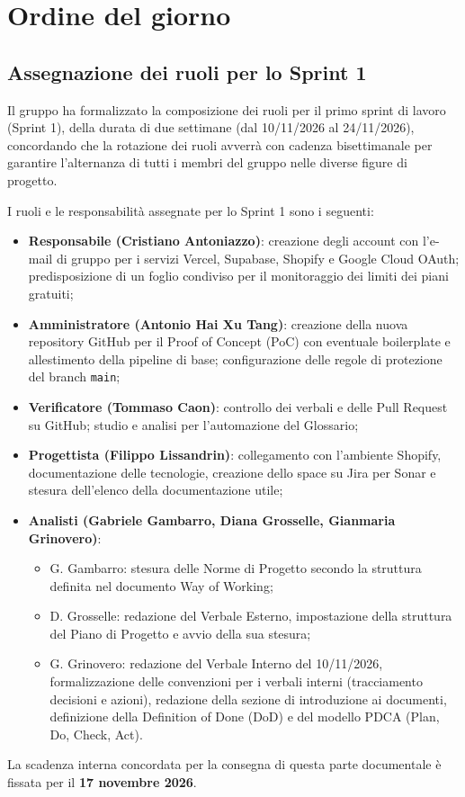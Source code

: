 \newpage
\vspace{0.8cm}

\section{Ordine del giorno}

\subsection{Assegnazione dei ruoli per lo Sprint 1}
Il gruppo ha formalizzato la composizione dei ruoli per il primo sprint di lavoro (Sprint 1), della durata di due settimane (dal 10/11/2026 al 24/11/2026), concordando che la rotazione dei ruoli avverrà con cadenza bisettimanale per garantire l'alternanza di tutti i membri del gruppo nelle diverse figure di progetto.

I ruoli e le responsabilità assegnate per lo Sprint 1 sono i seguenti:
\begin{itemize}
    \item \textbf{Responsabile (Cristiano Antoniazzo)}: creazione degli account con l'e-mail di gruppo per i servizi Vercel, Supabase, Shopify e Google Cloud OAuth; predisposizione di un foglio condiviso per il monitoraggio dei limiti dei piani gratuiti;
    \item \textbf{Amministratore (Antonio Hai Xu Tang)}: creazione della nuova repository GitHub per il Proof of Concept (PoC) con eventuale boilerplate e allestimento della pipeline di base; configurazione delle regole di protezione del branch \texttt{main};
    \item \textbf{Verificatore (Tommaso Caon)}: controllo dei verbali e delle Pull Request su GitHub; studio e analisi per l'automazione del Glossario;
    \item \textbf{Progettista (Filippo Lissandrin)}: collegamento con l'ambiente Shopify, documentazione delle tecnologie, creazione dello space su Jira per Sonar e stesura dell'elenco della documentazione utile;
    \item \textbf{Analisti (Gabriele Gambarro, Diana Grosselle, Gianmaria Grinovero)}:
    \begin{itemize}
        \item G. Gambarro: stesura delle Norme di Progetto secondo la struttura definita nel documento Way of Working;
        \item D. Grosselle: redazione del Verbale Esterno, impostazione della struttura del Piano di Progetto e avvio della sua stesura;
        \item G. Grinovero: redazione del Verbale Interno del 10/11/2026, formalizzazione delle convenzioni per i verbali interni (tracciamento decisioni e azioni), redazione della sezione di introduzione ai documenti, definizione della Definition of Done (DoD) e del modello PDCA (Plan, Do, Check, Act).
    \end{itemize}
\end{itemize}
La scadenza interna concordata per la consegna di questa parte documentale è fissata per il \textbf{17 novembre 2026}.

